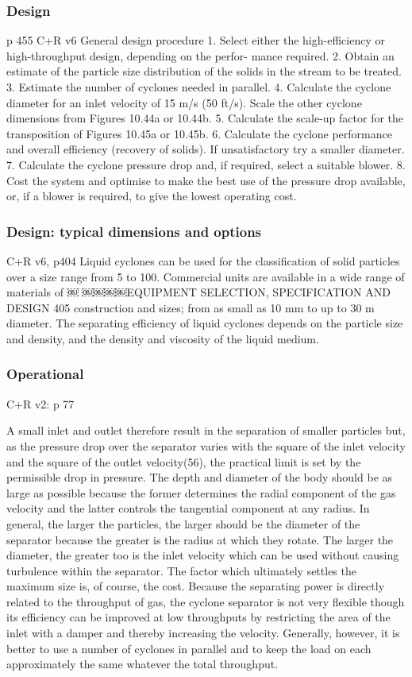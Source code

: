 \begin{frame}\frametitle{Design}
	p 455 C+R v6
	General design procedure
	1. Select either the high-efficiency or high-throughput design, depending on the perfor- mance required.
	2. Obtain an estimate of the particle size distribution of the solids in the stream to be treated.
	3. Estimate the number of cyclones needed in parallel.
	4. Calculate the cyclone diameter for an inlet velocity of 15 m/s (50 ft/s). Scale the
	other cyclone dimensions from Figures 10.44a or 10.44b.
	5. Calculate the scale-up factor for the transposition of Figures 10.45a or 10.45b.
	6. Calculate the cyclone performance and overall efficiency (recovery of solids). If
	unsatisfactory try a smaller diameter.
	7. Calculate the cyclone pressure drop and, if required, select a suitable blower.
	8. Cost the system and optimise to make the best use of the pressure drop available,
	or, if a blower is required, to give the lowest operating cost.
\end{frame}

\begin{frame}\frametitle{Design: typical dimensions and options}
	C+R v6, p404
	Liquid cyclones can be used for the classification of solid particles over a size range from 5 to 100\micron. Commercial units are available in a wide range of materials of
	￼
	￼￼￼￼EQUIPMENT SELECTION, SPECIFICATION AND DESIGN 405
	construction and sizes; from as small as 10 mm to up to 30 m diameter. The separating efficiency of liquid cyclones depends on the particle size and density, and the density and viscosity of the liquid medium.
\end{frame}

\begin{frame}\frametitle{Operational}
	C+R v2: p 77
	
	A small inlet and outlet therefore result in the separation of smaller particles but, as the pressure drop over the separator varies with the square of the inlet velocity and the square of the outlet velocity(56), the practical limit is set by the permissible drop in pressure. The depth and diameter of the body should be as large as possible because the former determines the radial component of the gas velocity and the latter controls the tangential component at any radius. In general, the larger the particles, the larger should be the diameter of the separator because the greater is the radius at which they rotate. The larger the diameter, the greater too is the inlet velocity which can be used without causing turbulence within the separator. The factor which ultimately settles the maximum size is, of course, the cost. Because the separating power is directly related to the throughput of gas, the cyclone separator is not very flexible though its efficiency can be improved at low throughputs by restricting the area of the inlet with a damper and thereby increasing the velocity. Generally, however, it is better to use a number of cyclones in parallel and to keep the load on each approximately the same whatever the total throughput.
	
\end{frame}


